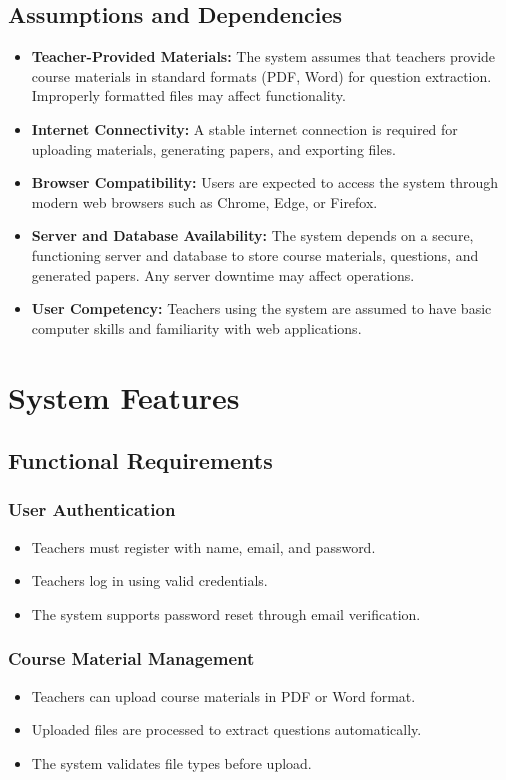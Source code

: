 \documentclass[12pt]{article}
\begin{document}
	\subsection{Assumptions and Dependencies}
	\begin{itemize}
		\item \textbf{Teacher-Provided Materials:} The system assumes that teachers provide course materials in standard formats (PDF, Word) for question extraction. Improperly formatted files may affect functionality.
		\item \textbf{Internet Connectivity:} A stable internet connection is required for uploading materials, generating papers, and exporting files.
		\item \textbf{Browser Compatibility:} Users are expected to access the system through modern web browsers such as Chrome, Edge, or Firefox.
		\item \textbf{Server and Database Availability:} The system depends on a secure, functioning server and database to store course materials, questions, and generated papers. Any server downtime may affect operations.
		\item \textbf{User Competency:} Teachers using the system are assumed to have basic computer skills and familiarity with web applications.
	\end{itemize}
	
	
	\section{System Features}
	
	
	\subsection{Functional Requirements}
	
	\subsubsection{User Authentication}
	\begin{itemize}
		\item Teachers must register with name, email, and password.
		\item Teachers log in using valid credentials.
		\item The system supports password reset through email verification.
	\end{itemize}
	
	\subsubsection{Course Material Management}
	\begin{itemize}
		\item Teachers can upload course materials in PDF or Word format.
		\item Uploaded files are processed to extract questions automatically.
		\item The system validates file types before upload.
	\end{itemize}
	
\end{document}
